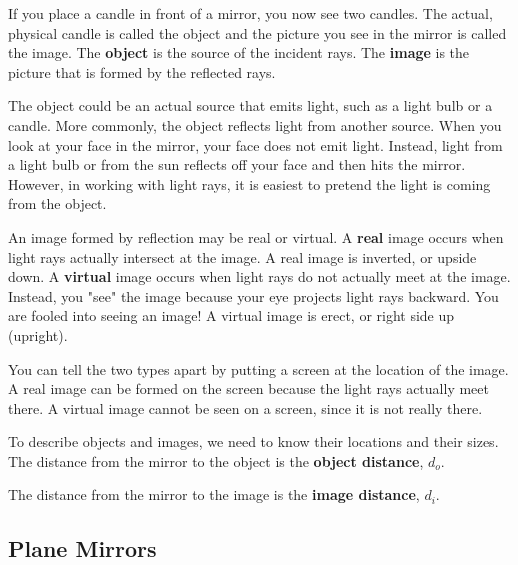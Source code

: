 If you place a candle in front of a mirror, you now see two candles. The actual, physical candle is called the object and the picture you see in the mirror is called the image. The \textbf{object} is the source of the incident rays. The \textbf{image} is the picture that is formed by the reflected rays.

The object could be an actual source that emits light, such as a light bulb or a candle. More commonly, the object reflects light from another source. When you look at your face in the mirror, your face does not emit light. Instead, light from a light bulb or from the sun reflects off your face and then hits the mirror. However, in working with light rays, it is easiest to pretend the light is coming from the object.

An image formed by reflection may be real or virtual. A {\bf real} image occurs when light rays actually intersect at the image. A real image is inverted, or upside down. A {\bf virtual} image occurs when light rays do not actually meet at the image. Instead, you "see" the image because your eye projects light rays backward. You are fooled into seeing an image! A virtual image is erect, or right side up (upright).

You can tell the two types apart by putting a screen at the location of the image. A real image can be formed on the screen because the light rays actually meet there. A virtual image cannot be seen on a screen, since it is not really there.

To describe objects and images, we need to know their locations and their sizes. The distance from the mirror to the object is the \textbf{object distance}, $d_o$.

The distance from the mirror to the image is the \textbf{image distance}, $d_i$. 

\subsection{Plane Mirrors}

